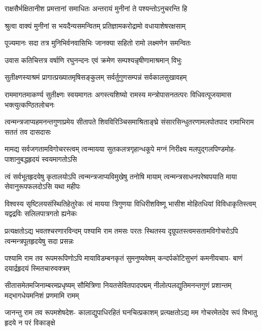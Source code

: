 \twolineshloka
{राक्षसैर्भक्षितानीश प्रमत्तानां समाधितः}
{अन्तरायं मुनीनां ते पश्यन्तोऽनुचरन्ति हि} %

\twolineshloka
{श्रुत्वा वाक्यं मुनीनां स भयदैन्यसमन्वितम्}
{प्रतिज्ञामकरोद्रामो वधायाशेषरक्षसाम्} %

\twolineshloka
{पूज्यमानः सदा तत्र मुनिभिर्वनवासिभिः}
{जानक्या सहितो रामो लक्ष्मणेन समन्वितः} %

\twolineshloka
{उवास कतिचित्तत्र वर्षाणि रघुनन्दनः}
{एवं क्रमेण सम्पश्यन्नृषीणामाश्रमान् विभुः} %

\twolineshloka
{सुतीक्ष्णस्याश्रमं प्रागात्प्रख्यातमृषिसङ्कुलम्}
{सर्वर्तुगुणसम्पन्नं सर्वकालसुखावहम्} %

\threelineshloka
{राममागतमाकर्ण्य सुतीक्ष्णः स्वयमागतः}
{अगस्त्यशिष्यो रामस्य मन्त्रोपासनतत्परः}
{विधिवत्पूजयामास भक्त्युत्कण्ठितलोचनः} %


\fourlineindentedshloka
{त्वन्मन्त्रजाप्यहमनन्तगुणाप्रमेय}
{सीतापते शिवविरिञ्चिसमाश्रिताङ्घ्रे}
{संसारसिन्धुतरणामलपोतपाद}
{रामाभिराम सततं तव दासदासः} %

\fourlineindentedshloka
{मामद्य सर्वजगतामविगोचरस्त्वम्}
{त्वन्मायया सुतकलत्रगृहान्धकूपे}
{मग्नं निरीक्ष्य मलपुद्गलपिण्डमोह-}
{पाशानुबद्धहृदयं स्वयमागतोऽसि} %

\fourlineindentedshloka
{त्वं सर्वभूतहृदयेषु कृतालयोऽपि}
{त्वन्मन्त्रजाप्यविमुखेषु तनोषि मायाम्}
{त्वन्मन्त्रसाधनपरेष्वपयाति माया}
{सेवानुरूपफलदोऽसि यथा महीपः} %

\fourlineindentedshloka
{विश्वस्य सृष्टिलयसंस्थितिहेतुरेकः}
{त्वं मायया त्रिगुणया विधिरीशविष्णू}
{भासीश मोहितधियां विविधाकृतिस्त्वम्}
{यद्वद्रविः सलिलपात्रगतो ह्यनेकः} %

\fourlineindentedshloka
{प्रत्यक्षतोऽद्य भवतश्चरणारविन्दम्}
{पश्यामि राम तमसः परतः स्थितस्य}
{दृग्रूपतस्त्वमसतामविगोचरोऽपि}
{त्वन्मन्त्रपूतहृदयेषु सदा प्रसन्नः} %

\fourlineindentedshloka
{पश्यामि राम तव रूपमरूपिणोऽपि}
{मायाविडम्बनकृतं सुमनुष्यवेषम्}
{कन्दर्पकोटिसुभगं कमनीयचाप-}
{बाणं दयार्द्रहृदयं स्मितचारुवक्त्रम्} %

\fourlineindentedshloka
{सीतासमेतमजिनाम्बरमप्रधृष्यम्}
{सौमित्रिणा नियतसेवितपादपद्मम्}
{नीलोत्पलद्युतिमनन्तगुणं प्रशान्तम्}
{मद्भागधेयमनिशं प्रणमामि रामम्} %

\fourlineindentedshloka
{जानन्तु राम तव रूपमशेषदेश-}
{कालाद्युपाधिरहितं घनचित्प्रकाशम्}
{प्रत्यक्षतोऽद्य मम गोचरमेतदेव}
{रूपं विभातु हृदये न परं विकाङ्क्षे} %

